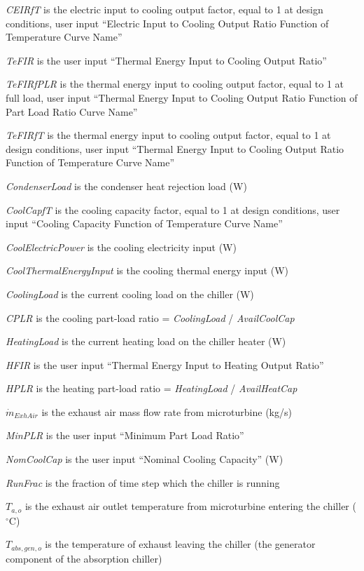 \emph{CEIRfT} is the electric input to cooling output factor, equal to 1 at design conditions, user input ``Electric Input to Cooling Output Ratio Function of Temperature Curve Name''

\emph{TeFIR} is the user input ``Thermal Energy Input to Cooling Output Ratio''

\emph{TeFIRfPLR} is the thermal energy input to cooling output factor, equal to 1 at full load, user input ``Thermal Energy Input to Cooling Output Ratio Function of Part Load Ratio Curve Name''

\emph{TeFIRfT} is the thermal energy input to cooling output factor, equal to 1 at design conditions, user input ``Thermal Energy Input to Cooling Output Ratio Function of Temperature Curve Name''

\emph{CondenserLoad} is the condenser heat rejection load (W)

\emph{CoolCapfT} is the cooling capacity factor, equal to 1 at design conditions, user input ``Cooling Capacity Function of Temperature Curve Name''

\emph{CoolElectricPower} is the cooling electricity input (W)

\emph{CoolThermalEnergyInput} is the cooling thermal energy input (W)

\emph{CoolingLoad} is the current cooling load on the chiller (W)

\emph{CPLR} is the cooling part-load ratio = \emph{CoolingLoad} / \emph{AvailCoolCap}

\emph{HeatingLoad} is the current heating load on the chiller heater (W)

\emph{HFIR} is the user input ``Thermal Energy Input to Heating Output Ratio''

\emph{HPLR} is the heating part-load ratio = \emph{HeatingLoad} / \emph{AvailHeatCap}

\({\dot m_{ExhAir}}\) is the exhaust air mass flow rate from microturbine (kg/s)

\emph{MinPLR} is the user input ``Minimum Part Load Ratio''

\emph{NomCoolCap} is the user input ``Nominal Cooling Capacity'' (W)

\emph{RunFrac} is the fraction of time step which the chiller is running

\({T_{a,o}}\) is the exhaust air outlet temperature from microturbine entering the chiller (\(^{\circ}\)C)

\({T_{abs,gen,o}}\) is the temperature of exhaust leaving the chiller (the generator component of the absorption chiller)

